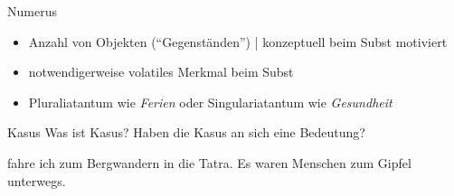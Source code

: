 \begin{frame}
  {Numerus}
  \pause
  \begin{exe}
    \ex
    \begin{xlist}
      \pause
    \end{xlist}
    \pause
    \ex
    \begin{xlist}
      \pause
    \end{xlist}
  \end{exe}
  \pause
  \Halbzeile
  \begin{itemize}[<+->]
    \item \alert{Anzahl von Objekten ("`Gegenständen"')} | konzeptuell beim Subst motiviert
    \item notwendigerweise volatiles Merkmal beim Subst
    \item Pluraliatantum wie \textit{Ferien} oder Singulariatantum wie \textit{Gesundheit}
  \end{itemize}
\end{frame}

\begin{frame}
  {Kasus}
  \pause
  Was ist Kasus? Haben die Kasus an sich eine Bedeutung?
  \Halbzeile
  \pause
  \begin{exe}
    \ex
    \begin{xlist}
      \pause
      \pause
      \pause
    \end{xlist}
    \pause
    \ex
    \begin{xlist}
      \ex {} fahre ich zum Bergwandern in die Tatra.
      \ex Es waren  Menschen zum Gipfel unterwegs.
    \end{xlist}
    \pause
    \ex
    \begin{xlist}
      \pause
      \pause
      \pause
    \end{xlist}
  \end{exe}
\end{frame}



